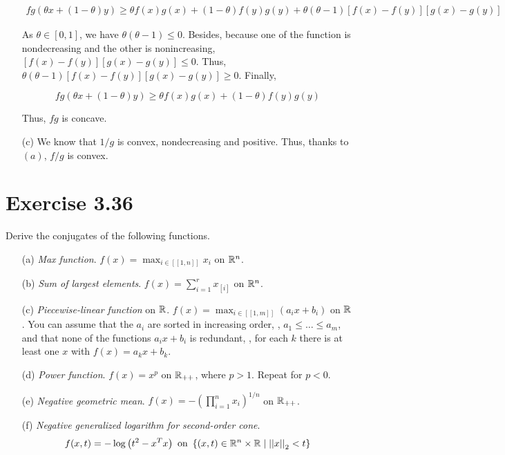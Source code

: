 \documentclass[a4paper, 11pt]{report}
\begin{document}
\begin{itemize}
    \begin{equation*}
        \begin{aligned}
        fg(\theta x + (1 - \theta)y) \geq \theta f(x)g(x) + (1 - \theta)f(y)g(y) + \theta(\theta - 1) \left[ f(x) - f(y) \right] \left[ g(x) - g(y) \right]
        \end{aligned}
    \end{equation*}
    
    As $\theta \in [0, 1]$, we have $\theta(\theta - 1) \leq 0$. Besides, because one of the function is nondecreasing and the other is nonincreasing, $\left[ f(x) - f(y) \right] \left[ g(x) - g(y) \right] \leq 0$. Thus, $\theta(\theta - 1) \left[ f(x) - f(y) \right] \left[ g(x) - g(y) \right] \geq 0$. Finally,
    
    \[ fg(\theta x + (1 - \theta)y) \geq \theta f(x)g(x) + (1 - \theta)f(y)g(y) \]
    
    Thus, $fg$ is concave.
    
    \item[(c)] We know that $1/g$ is convex, nondecreasing and positive. Thus, thanks to $(a)$, $f/g$ is convex.
\end{itemize}



\section*{Exercise 3.36}

Derive the conjugates of the following functions.

\begin{itemize}
    \item[(a)] \textit{Max function}. $f(x) = \max_{i \in [\![ 1, n ]\!]} x_{i}$ on $\mathbb{R}^{n}$.
    
    \item[(b)] \textit{Sum of largest elements}. $f(x) = \sum_{i = 1}^{r} x_{[i]}$ on $\mathbb{R}^{n}$.
    
    \item[(c)] \textit{Piecewise-linear function} on $\mathbb{R}$. $f(x) = \max_{i \in [\![ 1, m ]\!]} (a_{i}x + b_{i})$ on $\mathbb{R}$. You can assume that the $a_{i}$ are sorted in increasing order, \ie, $a_{1} \leq \dots \leq a_{m}$, and that none of the functions $a_{i}x + b_{i}$ is redundant, \ie, for each $k$ there is at least one $x$ with $f(x) = a_{k}x + b_{k}$.
    
    \item[(d)] \textit{Power function}. $f(x) = x^{p}$ on $\mathbb{R}_{++}$, where $p > 1$. Repeat for $p < 0$.
    
    \item[(e)] \textit{Negative geometric mean}. $f(x) = - \left( \prod_{i = 1}^{n} x_{i} \right)^{1/n}$ on $\mathbb{R}_{++}$.
    
    \item[(f)] \textit{Negative generalized logarithm for second-order cone}. 
    \[ f(x, t) = - \log \left( t^{2} - x^{T}x \right) \text{ on } \left\{ (x, t) \in \mathbb{R}^{n} \times \mathbb{R} \mid  \left|\left| x \right|\right|_{2} < t\right\} \]
\end{itemize}
\end{document}
